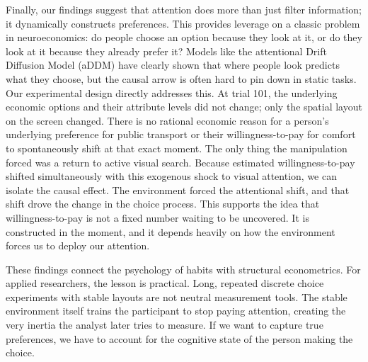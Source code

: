Finally, our findings suggest that attention does more than just filter information; it dynamically constructs preferences. This provides leverage on a classic problem in neuroeconomics: do people choose an option because they look at it, or do they look at it because they already prefer it? Models like the attentional Drift Diffusion Model (aDDM) \cite{krajbich2010, krajbichRangel2011} have clearly shown that where people look predicts what they choose, but the causal arrow is often hard to pin down in static tasks. Our experimental design directly addresses this. At trial 101, the underlying economic options and their attribute levels did not change; only the spatial layout on the screen changed. There is no rational economic reason for a person's underlying preference for public transport or their willingness-to-pay for comfort to spontaneously shift at that exact moment. The only thing the manipulation forced was a return to active visual search. Because estimated willingness-to-pay shifted simultaneously with this exogenous shock to visual attention, we can isolate the causal effect. The environment forced the attentional shift, and that shift drove the change in the choice process. This supports the idea that willingness-to-pay is not a fixed number waiting to be uncovered. It is constructed in the moment, and it depends heavily on how the environment forces us to deploy our attention.

These findings connect the psychology of habits \cite{bouton2020, pool2022} with structural econometrics. For applied researchers, the lesson is practical. Long, repeated discrete choice experiments with stable layouts are not neutral measurement tools. The stable environment itself trains the participant to stop paying attention, creating the very inertia the analyst later tries to measure. If we want to capture true preferences, we have to account for the cognitive state of the person making the choice.
